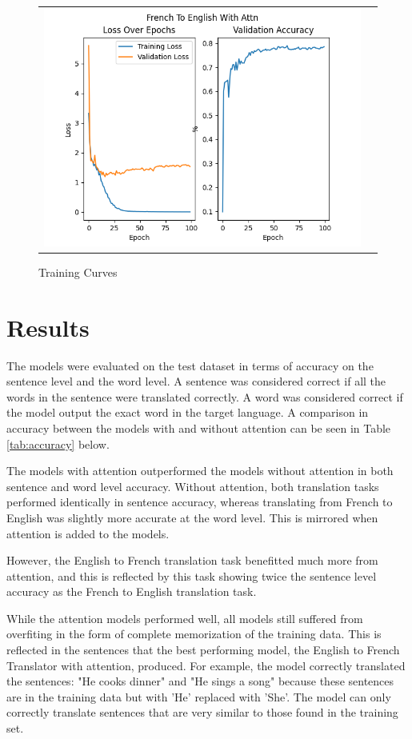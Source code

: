 \documentclass{article}
\begin{document}
\begin{figure}[htb]
\begin{tabularx}{\textwidth}{XX}
      \includegraphics{plots/fr2en_attn.png} \\
    \end{tabularx}
    \caption{Training Curves}
    \label{fig:losses}
\end{figure}


\section{Results}
The models were evaluated on the test dataset in terms of
accuracy on the sentence level and the word level. A
sentence was considered correct if all the words in the
sentence were translated correctly. A word was considered
correct if the model output the exact word in the target
language. A comparison in accuracy between the models with
and without attention can be seen in Table
\ref{tab:accuracy} below. 

The models with attention outperformed the models without
attention in both sentence and word level accuracy. Without
attention, both translation tasks performed identically in
sentence accuracy, whereas translating from French to
English was slightly more accurate at the word level. This
is mirrored when attention is added to the models.

However, the English to French translation task benefitted
much more from attention, and this is reflected by this task
showing twice the sentence level accuracy as the French to
English translation task.

While the attention models performed well, all models still
suffered from overfiting in the form of complete
memorization of the training data. This is reflected in the
sentences that the best performing model, the English to
French Translator with attention, produced. For example, the
model correctly translated the sentences: "He cooks dinner"
and "He sings a song" because these sentences are in the
training data but with 'He' replaced with 'She'. The model
can only correctly translate sentences that are very similar
to those found in the training set. 
\end{document}
